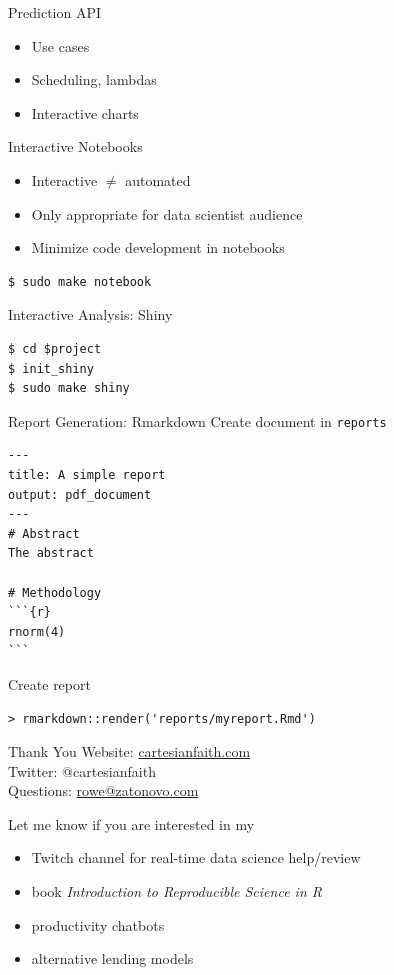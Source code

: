 \documentclass{beamer}
\begin{document}
\begin{frame}{Prediction API}

\begin{itemize}
\item Use cases
\item Scheduling, lambdas
\item Interactive charts
\end{itemize}
\end{frame}



\begin{frame}[fragile]{Interactive Notebooks}

\begin{itemize}
\item Interactive $\neq$ automated
\item Only appropriate for data scientist audience
\item Minimize code development in notebooks
\end{itemize}

\begin{lstlisting}
$ sudo make notebook
\end{lstlisting}
\end{frame}


\begin{frame}[fragile]{Interactive Analysis: Shiny}
\begin{lstlisting}
$ cd $project
$ init_shiny
$ sudo make shiny
\end{lstlisting}
\end{frame}


\begin{frame}[fragile]{Report Generation: Rmarkdown}
Create document in \lstinline|reports|
\begin{lstlisting}
---
title: A simple report
output: pdf_document
---
# Abstract
The abstract

# Methodology
```{r}
rnorm(4)
```
\end{lstlisting}

Create report
\begin{lstlisting}
> rmarkdown::render('reports/myreport.Rmd')
\end{lstlisting}
\end{frame}



\begin{frame}{Thank You}
Website: \href{https://cartesianfaith.com}{cartesianfaith.com}\\
Twitter: @cartesianfaith\\
Questions: \href{mailto:rowe@zatonovo.com}{rowe@zatonovo.com}

Let me know if you are interested in my

\begin{itemize}
\item Twitch channel for real-time data science help/review
\item book \emph{Introduction to Reproducible Science in R}
\item productivity chatbots
\item alternative lending models
\end{itemize}
\end{frame}
\end{document}
